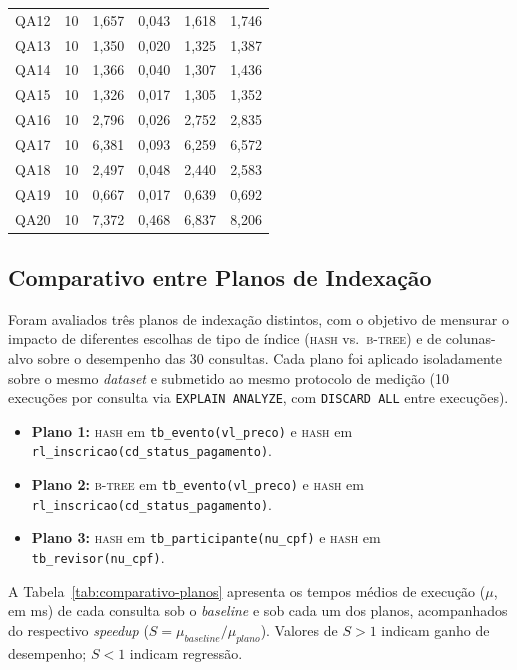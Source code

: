 \documentclass[12pt,a4paper]{article}
\begin{document}
\begin{longtable}{|c|c|r|r|r|r|}
QA12 & 10 & 1,657 & 0,043 & 1,618 & 1,746 \\
QA13 & 10 & 1,350 & 0,020 & 1,325 & 1,387 \\
QA14 & 10 & 1,366 & 0,040 & 1,307 & 1,436 \\
QA15 & 10 & 1,326 & 0,017 & 1,305 & 1,352 \\
QA16 & 10 & 2,796 & 0,026 & 2,752 & 2,835 \\
QA17 & 10 & 6,381 & 0,093 & 6,259 & 6,572 \\
QA18 & 10 & 2,497 & 0,048 & 2,440 & 2,583 \\
QA19 & 10 & 0,667 & 0,017 & 0,639 & 0,692 \\
QA20 & 10 & 7,372 & 0,468 & 6,837 & 8,206 \\
\hline
\end{longtable}

\subsection{Comparativo entre Planos de Indexação}
\label{subsec:comparativo-planos}

Foram avaliados três planos de indexação distintos, com o objetivo de mensurar o
impacto de diferentes escolhas de tipo de índice (\textsc{hash} vs.\ \textsc{b-tree})
e de colunas-alvo sobre o desempenho das 30 consultas. Cada plano foi aplicado
isoladamente sobre o mesmo \emph{dataset} e submetido ao mesmo protocolo de
medição (10 execuções por consulta via \texttt{EXPLAIN ANALYZE}, com
\texttt{DISCARD ALL} entre execuções).

\begin{itemize}[leftmargin=2cm]
    \item \textbf{Plano 1:} \textsc{hash} em \texttt{tb\_evento(vl\_preco)} e
          \textsc{hash} em \texttt{rl\_inscricao(cd\_status\_pagamento)}.
    \item \textbf{Plano 2:} \textsc{b-tree} em \texttt{tb\_evento(vl\_preco)} e
          \textsc{hash} em \texttt{rl\_inscricao(cd\_status\_pagamento)}.
    \item \textbf{Plano 3:} \textsc{hash} em \texttt{tb\_participante(nu\_cpf)} e
          \textsc{hash} em \texttt{tb\_revisor(nu\_cpf)}.
\end{itemize}

A Tabela~\ref{tab:comparativo-planos} apresenta os tempos médios de execução
($\mu$, em ms) de cada consulta sob o \emph{baseline} e sob cada um dos planos,
acompanhados do respectivo \emph{speedup} ($S = \mu_{baseline}/\mu_{plano}$).
Valores de $S > 1$ indicam ganho de desempenho; $S < 1$ indicam regressão.
\end{document}
